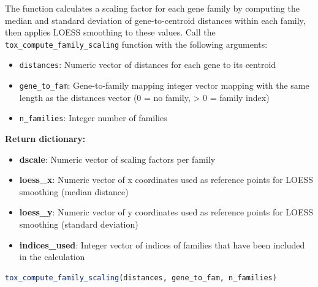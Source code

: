 \begin{enumerate}
\begin{enumerate}
                  The function calculates a scaling factor for each gene family by computing
                  the median and standard deviation of gene-to-centroid distances within
                  each family, then applies LOESS smoothing to these values. Call the \texttt{tox\_compute\_family\_scaling}
                  function with the following arguments:
                  
                  \begin{itemize}
                    \item \texttt{distances}: Numeric vector of distances for each gene to
                          its centroid
                          
                    \item \texttt{gene\_to\_fam}: Gene-to-family mapping integer vector mapping
                          with the same length as the distances vector (0 = no family, \textgreater
                          0 = family index)
                          
                    \item \texttt{n\_families}: Integer number of families
                  \end{itemize}
                  
                  \textbf{Return dictionary:}
                  \begin{itemize}
                    \item \textbf{dscale}: Numeric vector of scaling factors per family
                          
                    \item \textbf{loess\_x}: Numeric vector of x coordinates used as reference
                          points for LOESS smoothing (median distance)
                          
                    \item \textbf{loess\_y}: Numeric vector of y coordinates used as reference
                          points for LOESS smoothing (standard deviation)
                          
                    \item \textbf{indices\_used}: Integer vector of indices of families that
                          have been included in the calculation
                  \end{itemize}
                  
                  \begin{lstlisting}[language=R, caption={R Compute Family Scaling}]
tox_compute_family_scaling(distances, gene_to_fam, n_families)
                  \end{lstlisting}
                  

\end{enumerate}
\end{enumerate}
